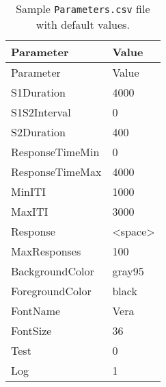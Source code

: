 \documentclass[11pt,]{article}
\begin{document}
\begin{longtable}[c]{@{}ll@{}}
\caption{Sample \texttt{Parameters.csv} file with default
values.}\tabularnewline
\toprule
Parameter & Value\tabularnewline
\midrule
\endfirsthead
\toprule
Parameter & Value\tabularnewline
\midrule
\endhead
S1Duration & 4000\tabularnewline
S1S2Interval & 0\tabularnewline
S2Duration & 400\tabularnewline
ResponseTimeMin & 0\tabularnewline
ResponseTimeMax & 4000\tabularnewline
MinITI & 1000\tabularnewline
MaxITI & 3000\tabularnewline
Response & \textless{}space\textgreater{}\tabularnewline
MaxResponses & 100\tabularnewline
BackgroundColor & gray95\tabularnewline
ForegroundColor & black\tabularnewline
FontName & Vera\tabularnewline
FontSize & 36\tabularnewline
Test & 0\tabularnewline
Log & 1\tabularnewline
\bottomrule
\end{longtable}
\end{document}

